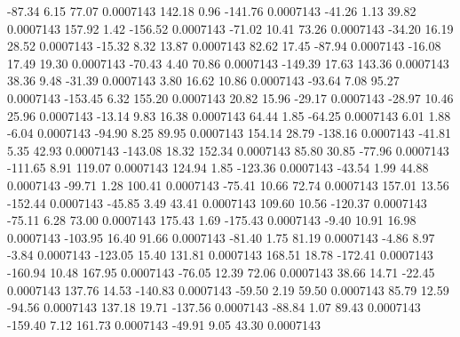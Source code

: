       -87.34        6.15       77.07     0.0007143
      142.18        0.96     -141.76     0.0007143
      -41.26        1.13       39.82     0.0007143
      157.92        1.42     -156.52     0.0007143
      -71.02       10.41       73.26     0.0007143
      -34.20       16.19       28.52     0.0007143
      -15.32        8.32       13.87     0.0007143
       82.62       17.45      -87.94     0.0007143
      -16.08       17.49       19.30     0.0007143
      -70.43        4.40       70.86     0.0007143
     -149.39       17.63      143.36     0.0007143
       38.36        9.48      -31.39     0.0007143
        3.80       16.62       10.86     0.0007143
      -93.64        7.08       95.27     0.0007143
     -153.45        6.32      155.20     0.0007143
       20.82       15.96      -29.17     0.0007143
      -28.97       10.46       25.96     0.0007143
      -13.14        9.83       16.38     0.0007143
       64.44        1.85      -64.25     0.0007143
        6.01        1.88       -6.04     0.0007143
      -94.90        8.25       89.95     0.0007143
      154.14       28.79     -138.16     0.0007143
      -41.81        5.35       42.93     0.0007143
     -143.08       18.32      152.34     0.0007143
       85.80       30.85      -77.96     0.0007143
     -111.65        8.91      119.07     0.0007143
      124.94        1.85     -123.36     0.0007143
      -43.54        1.99       44.88     0.0007143
      -99.71        1.28      100.41     0.0007143
      -75.41       10.66       72.74     0.0007143
      157.01       13.56     -152.44     0.0007143
      -45.85        3.49       43.41     0.0007143
      109.60       10.56     -120.37     0.0007143
      -75.11        6.28       73.00     0.0007143
      175.43        1.69     -175.43     0.0007143
       -9.40       10.91       16.98     0.0007143
     -103.95       16.40       91.66     0.0007143
      -81.40        1.75       81.19     0.0007143
       -4.86        8.97       -3.84     0.0007143
     -123.05       15.40      131.81     0.0007143
      168.51       18.78     -172.41     0.0007143
     -160.94       10.48      167.95     0.0007143
      -76.05       12.39       72.06     0.0007143
       38.66       14.71      -22.45     0.0007143
      137.76       14.53     -140.83     0.0007143
      -59.50        2.19       59.50     0.0007143
       85.79       12.59      -94.56     0.0007143
      137.18       19.71     -137.56     0.0007143
      -88.84        1.07       89.43     0.0007143
     -159.40        7.12      161.73     0.0007143
      -49.91        9.05       43.30     0.0007143
